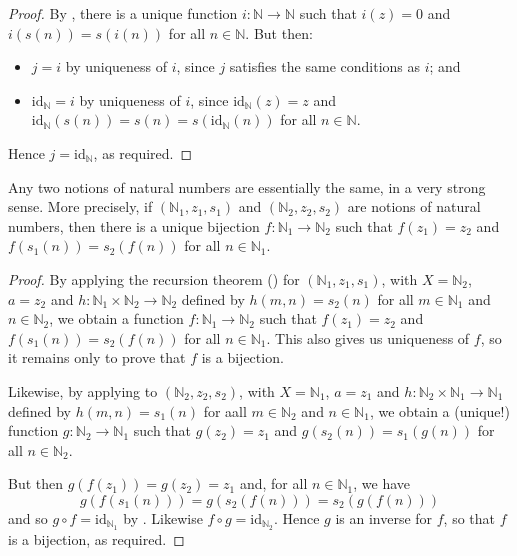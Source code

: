 \begin{proof}
By , there is a unique function $i : \mathbb{N} \to \mathbb{N}$ such that $i(z)=0$ and $i(s(n)) = s(i(n))$ for all $n \in \mathbb{N}$. But then:
\begin{itemize}
\item $j = i$ by uniqueness of $i$, since $j$ satisfies the same conditions as $i$; and
\item $\mathrm{id}_\mathbb{N} = i$ by uniqueness of $i$, since $\mathrm{id}_\mathbb{N}(z) = z$ and $\mathrm{id}_\mathbb{N}(s(n)) = s(n) = s(\mathrm{id}_\mathbb{N}(n))$ for all $n \in \mathbb{N}$.
\end{itemize}
Hence $j = \mathrm{id}_\mathbb{N}$, as required.
\end{proof}

\begin{theorem}
\label{thmNNNUnique}
Any two notions of natural numbers are essentially the same, in a very strong sense. More precisely, if $(\mathbb{N}_1, z_1, s_1)$ and $(\mathbb{N}_2, z_2, s_2)$ are notions of natural numbers, then there is a unique bijection $f : \mathbb{N}_1 \to \mathbb{N}_2$ such that $f(z_1) = z_2$ and $f(s_1(n)) = s_2(f(n))$ for all $n \in \mathbb{N}_1$.
\end{theorem}

\begin{proof}
By applying the recursion theorem () for $(\mathbb{N}_1, z_1, s_1)$, with $X = \mathbb{N}_2$, $a = z_2$ and $h : \mathbb{N}_1 \times \mathbb{N}_2 \to \mathbb{N}_2$ defined by $h(m,n) = s_2(n)$ for all $m \in \mathbb{N}_1$ and $n \in \mathbb{N}_2$, we obtain a function $f : \mathbb{N}_1 \to \mathbb{N}_2$ such that $f(z_1) = z_2$ and $f(s_1(n)) = s_2(f(n))$ for all $n \in \mathbb{N}_1$. This also gives us uniqueness of $f$, so it remains only to prove that $f$ is a bijection.

Likewise, by applying  to $(\mathbb{N}_2, z_2, s_2)$, with $X = \mathbb{N}_1$, $a = z_1$ and $h : \mathbb{N}_2 \times \mathbb{N}_1 \to \mathbb{N}_1$ defined by $h(m,n) = s_1(n)$ for aall $m \in \mathbb{N}_2$ and $n \in \mathbb{N}_1$, we obtain a (unique!) function $g : \mathbb{N}_2 \to \mathbb{N}_1$ such that $g(z_2) = z_1$ and $g(s_2(n)) = s_1(g(n))$ for all $n \in \mathbb{N}_2$.

But then $g(f(z_1)) = g(z_2) = z_1$ and, for all $n \in \mathbb{N}_1$, we have
\[ g(f(s_1(n))) = g(s_2(f(n))) = s_2(g(f(n))) \]
and so $g \circ f = \mathrm{id}_{\mathbb{N}_1}$ by . Likewise $f \circ g = \mathrm{id}_{\mathbb{N}_2}$. Hence $g$ is an inverse for $f$, so that $f$ is a bijection, as required.
\end{proof}

